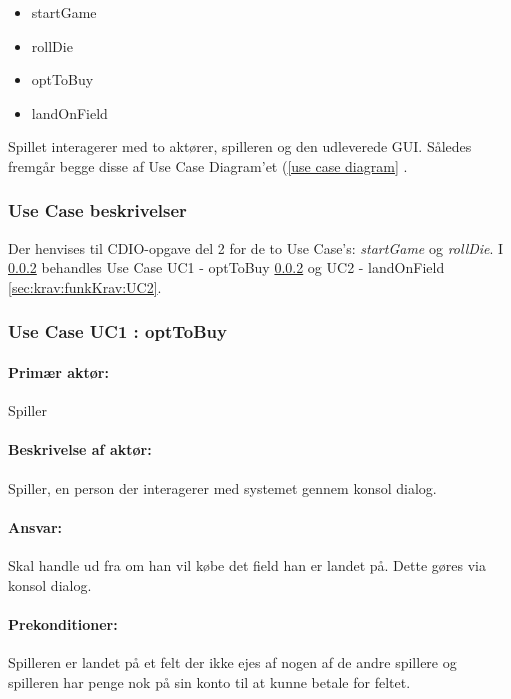 \begin{itemize}
\item startGame
\item rollDie
\item optToBuy
\item landOnField
\end{itemize}

Spillet interagerer med to aktører, spilleren og den udleverede GUI. Således fremgår begge disse af Use Case Diagram'et (\vref{use case diagram} .

\subsubsection{Use Case beskrivelser}\label{sec:krav:funkKrav:useCaseBeskriv}
Der henvises til CDIO-opgave del 2 for de to Use Case's: \textit{startGame} og \textit{rollDie}. I \ref{sec:krav:funkKrav:UC1} behandles Use Case UC1 - optToBuy \ref{sec:krav:funkKrav:UC1} og UC2 - landOnField \ref{sec:krav:funkKrav:UC2}.

\subsubsection{Use Case UC1 : optToBuy}\label{sec:krav:funkKrav:UC1}

\paragraph{Primær aktør:} 
Spiller

\paragraph{Beskrivelse af aktør:} 
Spiller, en person der interagerer med systemet gennem konsol dialog.

\paragraph{Ansvar:} 
Skal handle ud fra om han vil købe det field han er landet på. Dette gøres via konsol dialog.
 
\paragraph{Prekonditioner:} 
Spilleren er landet på et felt der ikke ejes af nogen af de andre spillere og spilleren har penge nok på sin konto til at kunne betale for feltet.

